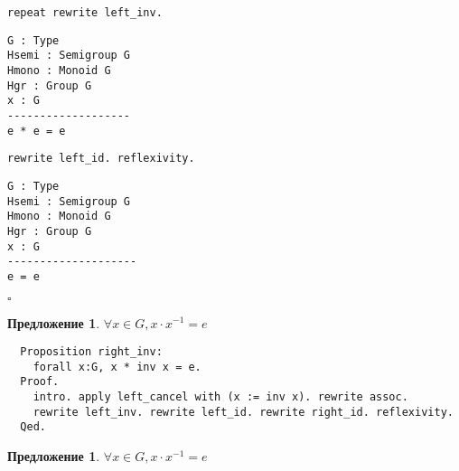 \documentclass[12pt]{article}
\newcounter{thm}
\newtheorem{proposition}[thm]{Предложение}
\begin{document}
\bigskip
\begin{minipage}{.46\textwidth}
\texttt{repeat rewrite left_inv.}
\begin{verbatim}
G : Type
Hsemi : Semigroup G
Hmono : Monoid G
Hgr : Group G
x : G
-------------------
e * e = e
\end{verbatim}
\end{minipage}
\hfill
\begin{minipage}{.46\textwidth}
\texttt{rewrite left_id. reflexivity.}
\begin{verbatim}
G : Type
Hsemi : Semigroup G
Hmono : Monoid G
Hgr : Group G
x : G
--------------------
e = e
\end{verbatim}$\square$
\end{minipage}

\begin{proposition}
$\forall x \in G, x \cdot x^{-1} = e$
\end{proposition}

\begin{verbatim}
  Proposition right_inv:
    forall x:G, x * inv x = e.
  Proof.
    intro. apply left_cancel with (x := inv x). rewrite assoc.
    rewrite left_inv. rewrite left_id. rewrite right_id. reflexivity.
  Qed.
\end{verbatim}

\begin{proposition}
$\forall x \in G, x \cdot x^{-1} = e$
\end{proposition}
\end{document}
